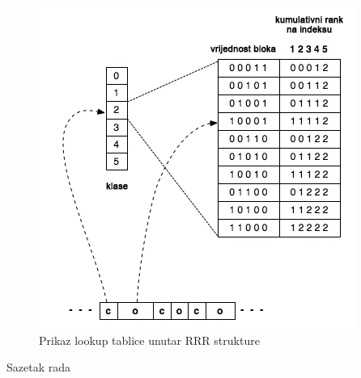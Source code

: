 \documentclass[times, utf8, seminar, numeric]{fer}
\begin{document}
\begin{figure}[ht]
	\centering
	\includegraphics[width=\textwidth]{img/rrr-binary-table.png}
	\caption{Prikaz lookup tablice unutar RRR strukture}
	\label{fig:rrr-binary-table}
\end{figure}




\begin{sazetak}
Sazetak rada

\end{sazetak}
\end{document}
